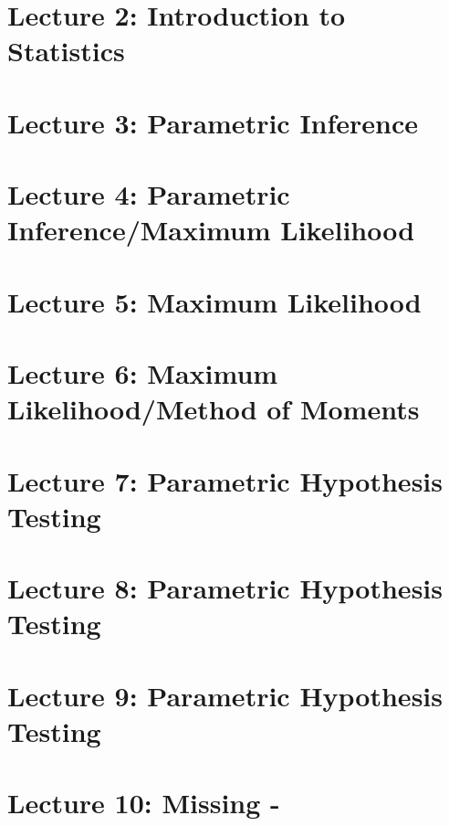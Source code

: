 \documentclass{article}
\begin{document}
\section{Lecture 2: Introduction to Statistics}

\section{Lecture 3: Parametric Inference}



\section{Lecture 4: Parametric Inference/Maximum Likelihood} 



\section{Lecture 5: Maximum Likelihood}



\section{Lecture 6: Maximum Likelihood/Method of Moments}



\section{Lecture 7: Parametric Hypothesis Testing}



\section{Lecture 8: Parametric Hypothesis Testing}


\section{Lecture 9: Parametric Hypothesis Testing}


\section{Lecture 10: Missing - }
\end{document}

